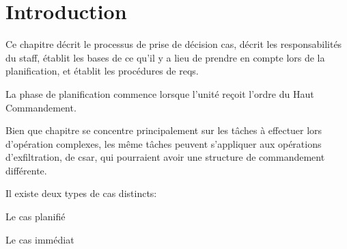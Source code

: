 \section{Introduction}

Ce chapitre décrit le processus de prise de décision \gls{cas}, décrit les responsabilités du staff, établit les bases de ce qu'il y a lieu de prendre en compte lors de la planification, et établit les procédures de \glspl{req}.

La phase de planification commence lorsque l'unité reçoit l'ordre du Haut Commandement.

Bien que chapitre se concentre principalement sur les tâches à effectuer lors d'opération complexes, les même tâches peuvent s'appliquer aux opérations d'exfiltration, de \gls{csar}, qui pourraient avoir une structure de commandement différente.


\begin{e1}
	\item Il existe deux types de \gls{cas} distincts:
	\begin{e2}
		\item Le \gls{cas} planifié
		\item Le \gls{cas} immédiat
	\end{e2}
\end{e1}